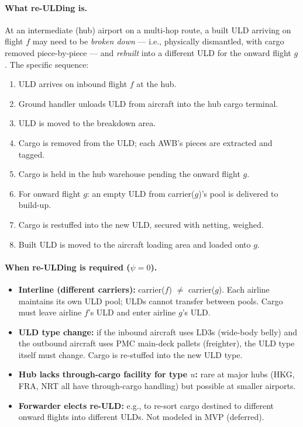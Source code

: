 \documentclass[11pt,a4paper]{article}
\theoremstyle{definition}
\begin{document}
\paragraph{What re-ULDing is.}
At an intermediate (hub) airport on a multi-hop route, a built ULD arriving on flight $f$
may need to be \emph{broken down} — i.e., physically dismantled, with cargo removed
piece-by-piece — and \emph{rebuilt} into a different ULD for the onward flight $g$. The
specific sequence:
\begin{enumerate}[noitemsep]
  \item ULD arrives on inbound flight $f$ at the hub.
  \item Ground handler unloads ULD from aircraft into the hub cargo terminal.
  \item ULD is moved to the breakdown area.
  \item Cargo is removed from the ULD; each AWB's pieces are extracted and tagged.
  \item Cargo is held in the hub warehouse pending the onward flight $g$.
  \item For onward flight $g$: an empty ULD from carrier($g$)'s pool is delivered to build-up.
  \item Cargo is restuffed into the new ULD, secured with netting, weighed.
  \item Built ULD is moved to the aircraft loading area and loaded onto $g$.
\end{enumerate}

\paragraph{When re-ULDing is required ($\psi = 0$).}
\begin{itemize}[noitemsep]
  \item \textbf{Interline (different carriers):} carrier($f$) $\neq$ carrier($g$). Each
        airline maintains its own ULD pool; ULDs cannot transfer between pools. Cargo must
        leave airline $f$'s ULD and enter airline $g$'s ULD.
  \item \textbf{ULD type change:} if the inbound aircraft uses LD3s (wide-body belly) and
        the outbound aircraft uses PMC main-deck pallets (freighter), the ULD type itself
        must change. Cargo is re-stuffed into the new ULD type.
  \item \textbf{Hub lacks through-cargo facility for type $u$:} rare at major hubs (HKG,
        FRA, NRT all have through-cargo handling) but possible at smaller airports.
  \item \textbf{Forwarder elects re-ULD:} e.g., to re-sort cargo destined to different
        onward flights into different ULDs. Not modeled in MVP (deferred).
\end{itemize}
\end{document}
